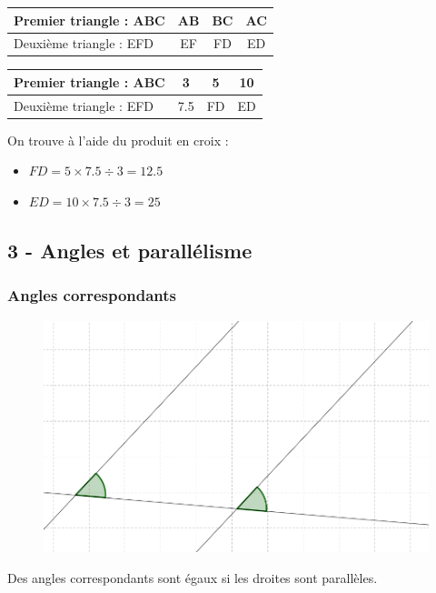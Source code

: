 \documentclass[11pt]{article}
\begin{document}
\begin{multicols}{2}

  \begin{center}
    \begin{tabular}{|l|c|c|c|}
      \hline
      Premier triangle  : ABC & AB & BC  & AC \\  \hline
      Deuxième triangle : EFD & EF & FD & ED \\  \hline
    \end{tabular}
  \end{center}

  \begin{center}
    \begin{tabular}{|l|c|c|c|}
      \hline
      Premier triangle  : ABC & 3   & 5  & 10 \\  \hline
      Deuxième triangle : EFD & 7.5 & FD & ED \\  \hline
    \end{tabular}
  \end{center}

  On trouve à l'aide du produit en croix :

  \begin{itemize}
    \item $FD = 5 \times 7.5 \div 3 = 12.5$
    \item $ED = 10 \times 7.5 \div 3 = 25$
  \end{itemize}

\end{multicols}

\newpage
\subsection*{3 - Angles et parallélisme}

\subsubsection*{Angles correspondants}

  \begin{figure}[H]
    \centering
    \includegraphics[width=0.3\linewidth]{3x6-thales/sources/dr-1.png}
  \end{figure}

  \begin{center}Des angles correspondants sont égaux si les droites sont parallèles. \end{center}
\end{document}
